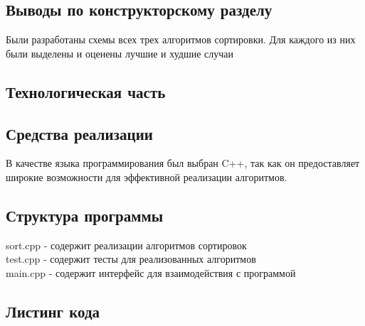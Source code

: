 \documentclass[a4paper,12pt]{article}
\begin{document}
    
    \begin{center}
    	\subsection{Выводы по конструкторскому разделу}    
    \end{center}
   
    	\qquad Были разработаны схемы всех трех алгоритмов сортировки. Для каждого из них были выделены и оценены лучшие и худшие случаи
    	
    \newpage
    
    \begin{center}
     	\section{Технологическая часть}    	
        \subsection{Средства реализации}    
    \end{center}
    
		В качестве языка программирования был выбран C++, так как он предоставляет широкие возможности для эффективной реализации алгоритмов.
	\begin{center}
	\end{center}
	\begin{center}
		\subsection{Структура программы}	
		\end{center}
	
    	\noindent sort.cpp - содержит реализации алгоритмов сортировок\\
    	test.cpp - содержит тесты для реализованных алгоритмов\\
	    main.cpp - содержит интерфейс для взаимодействия с программой\\
		\newpage
    \begin{center}
        \subsection{Листинг кода}    
    \end{center}
        	
\end{document}
